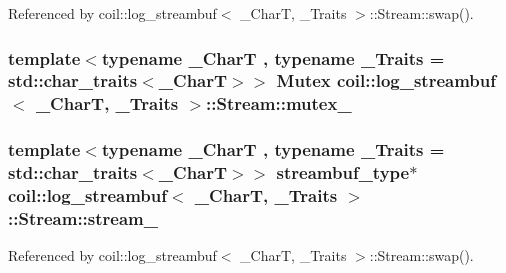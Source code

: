 Referenced by coil::log\_\-streambuf$<$ \_\-CharT, \_\-Traits $>$::Stream::swap().

\subsubsection[{mutex\_\-}]{\setlength{\rightskip}{0pt plus 5cm}template$<$typename \_\-CharT , typename \_\-Traits  = std::char\_\-traits$<$\_\-CharT$>$$>$ {\bf Mutex} {\bf coil::log\_\-streambuf}$<$ \_\-CharT, \_\-Traits $>$::{\bf Stream::mutex\_\-}\hspace{0.3cm}{\ttfamily  [mutable]}}\label{structcoil_1_1log__streambuf_1_1Stream_aeadb126688858c2934096affbcb9721a}
\subsubsection[{stream\_\-}]{\setlength{\rightskip}{0pt plus 5cm}template$<$typename \_\-CharT , typename \_\-Traits  = std::char\_\-traits$<$\_\-CharT$>$$>$ {\bf streambuf\_\-type}$\ast$ {\bf coil::log\_\-streambuf}$<$ \_\-CharT, \_\-Traits $>$::{\bf Stream::stream\_\-}}\label{structcoil_1_1log__streambuf_1_1Stream_a1f4114e35d655390b004ccb0cad39039}


Referenced by coil::log\_\-streambuf$<$ \_\-CharT, \_\-Traits $>$::Stream::swap().

